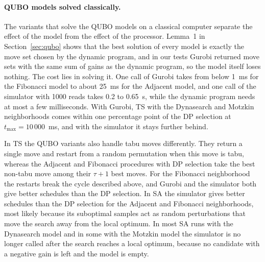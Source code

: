 \documentclass[10pt,twoside,twocolumn,a4paper]{article}
\newif\ifrevmarks \revmarksfalse
\newenvironment{revblock}{\ifrevmarks\color{red}\fi}{}
\begin{document}
\begin{revblock}
\paragraph{QUBO models solved classically.} The variants that solve the QUBO models on a classical computer separate the effect of the model from the effect of the processor. Lemma~1 in Section~\ref{sec:qubo} shows that the best solution of every model is exactly the move set chosen by the dynamic program, and in our tests Gurobi returned move sets with the same sum of gains as the dynamic program, so the model itself loses nothing. The cost lies in solving it. One call of Gurobi takes from below 1~ms for the Fibonacci model to about 25~ms for the Adjacent model, and one call of the simulator with 1000 reads takes 0.2 to 0.65~s, while the dynamic program needs at most a few milliseconds. With Gurobi, TS with the Dynasearch and Motzkin neighborhoods comes within one percentage point of the DP selection at $t_{\max}=10\,000$~ms, and with the simulator it stays further behind.

In TS the QUBO variants also handle tabu moves differently. They return a single move and restart from a random permutation when this move is tabu, whereas the Adjacent and Fibonacci procedures with DP selection take the best non-tabu move among their $\tau+1$ best moves. For the Fibonacci neighborhood the restarts break the cycle described above, and Gurobi and the simulator both give better schedules than the DP selection. In SA the simulator gives better schedules than the DP selection for the Adjacent and Fibonacci neighborhoods, most likely because its suboptimal samples act as random perturbations that move the search away from the local optimum. In most SA runs with the Dynasearch model and in some with the Motzkin model the simulator is no longer called after the search reaches a local optimum, because no candidate with a negative gain is left and the model is empty.


\end{revblock}
\end{document}
